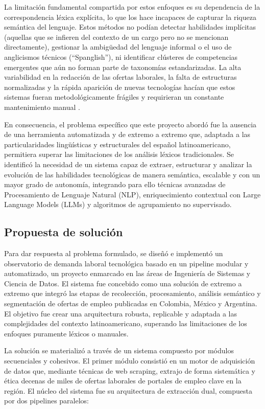 La limitación fundamental compartida por estos enfoques es su dependencia de la correspondencia léxica explícita, lo que los hace incapaces de capturar la riqueza semántica del lenguaje. Estos métodos no podían detectar habilidades implícitas (aquellas que se infieren del contexto de un cargo pero no se mencionan directamente), gestionar la ambigüedad del lenguaje informal o el uso de anglicismos técnicos (``Spanglish''), ni identificar clústeres de competencias emergentes que aún no forman parte de taxonomías estandarizadas. La alta variabilidad en la redacción de las ofertas laborales, la falta de estructuras normalizadas y la rápida aparición de nuevas tecnologías hacían que estos sistemas fueran metodológicamente frágiles y requirieran un constante mantenimiento manual \cite{echeverria2022, lukauskas2023}.

En consecuencia, el problema específico que este proyecto abordó fue la ausencia de una herramienta automatizada y de extremo a extremo que, adaptada a las particularidades lingüísticas y estructurales del español latinoamericano, permitiera superar las limitaciones de los análisis léxicos tradicionales. Se identificó la necesidad de un sistema capaz de extraer, estructurar y analizar la evolución de las habilidades tecnológicas de manera semántica, escalable y con un mayor grado de autonomía, integrando para ello técnicas avanzadas de Procesamiento de Lenguaje Natural (NLP), enriquecimiento contextual con Large Language Models (LLMs) y algoritmos de agrupamiento no supervisado.

\subsection{Propuesta de solución}

Para dar respuesta al problema formulado, se diseñó e implementó un observatorio de demanda laboral tecnológica basado en un pipeline modular y automatizado, un proyecto enmarcado en las áreas de Ingeniería de Sistemas y Ciencia de Datos. El sistema fue concebido como una solución de extremo a extremo que integró las etapas de recolección, procesamiento, análisis semántico y segmentación de ofertas de empleo publicadas en Colombia, México y Argentina. El objetivo fue crear una arquitectura robusta, replicable y adaptada a las complejidades del contexto latinoamericano, superando las limitaciones de los enfoques puramente léxicos o manuales.

La solución se materializó a través de un sistema compuesto por módulos secuenciales y cohesivos. El primer módulo consistió en un motor de adquisición de datos que, mediante técnicas de web scraping, extrajo de forma sistemática y ética decenas de miles de ofertas laborales de portales de empleo clave en la región. El núcleo del sistema fue su arquitectura de extracción dual, compuesta por dos pipelines paralelos:


